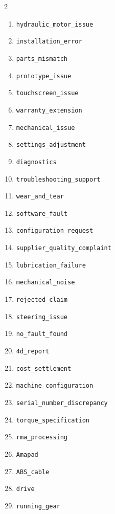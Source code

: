 \begin{multicols}{2}
\begin{enumerate}
    \item \texttt{hydraulic\_\allowbreak motor\_\allowbreak issue}
    \item \texttt{installation\_\allowbreak error}
    \item \texttt{parts\_\allowbreak mismatch}
    \item \texttt{prototype\_\allowbreak issue}
    \item \texttt{touchscreen\_\allowbreak issue}
    \item \texttt{warranty\_\allowbreak extension}
    \item \texttt{mechanical\_\allowbreak issue}
    \item \texttt{settings\_\allowbreak adjustment}
    \item \texttt{diagnostics}
    \item \texttt{troubleshooting\_\allowbreak support}
    \item \texttt{wear\_\allowbreak and\_\allowbreak tear}
    \item \texttt{software\_\allowbreak fault}
    \item \texttt{configuration\_\allowbreak request}
    \item \texttt{supplier\_\allowbreak quality\_\allowbreak complaint}
    \item \texttt{lubrication\_\allowbreak failure}
    \item \texttt{mechanical\_\allowbreak noise}
    \item \texttt{rejected\_\allowbreak claim}
    \item \texttt{steering\_\allowbreak issue}
    \item \texttt{no\_\allowbreak fault\_\allowbreak found}
    \item \texttt{4d\_\allowbreak report}
    \item \texttt{cost\_\allowbreak settlement}
    \item \texttt{machine\_\allowbreak configuration}
    \item \texttt{serial\_\allowbreak number\_\allowbreak discrepancy}
    \item \texttt{torque\_\allowbreak specification}
    \item \texttt{rma\_\allowbreak processing}
    \item \texttt{Amapad}
    \item \texttt{ABS\_\allowbreak cable}
    \item \texttt{drive}
    \item \texttt{running\_\allowbreak gear}

\end{enumerate}
\end{multicols}
